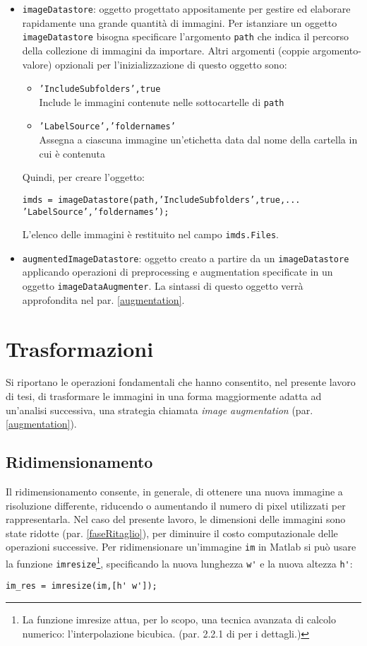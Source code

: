 \begin{itemize}

\item \verb|imageDatastore|: oggetto progettato appositamente per gestire ed elaborare rapidamente una grande quantità di immagini. Per istanziare un oggetto \verb|imageDatastore| bisogna specificare l'argomento \verb|path| che indica il percorso della collezione di immagini da importare. Altri argomenti (coppie argomento-valore) opzionali per l'inizializzazione di questo oggetto sono:
\begin{itemize}
\item \verb|’IncludeSubfolders’,true|\\
Include le immagini contenute nelle sottocartelle di \verb|path| 
\item \verb|’LabelSource’,’foldernames’|\\
Assegna a ciascuna immagine un’etichetta
data dal nome della cartella in cui è contenuta
\end{itemize}
Quindi, per creare l'oggetto:
\begin{verbatim}
imds = imageDatastore(path,’IncludeSubfolders’,true,...
’LabelSource’,’foldernames’);
\end{verbatim}
L’elenco delle immagini è restituito nel campo \verb|imds.Files|.

\item \verb|augmentedImageDatastore|: oggetto creato a partire da un \verb|imageDatastore| applicando operazioni di preprocessing e augmentation specificate in un oggetto \verb|imageDataAugmenter|. La sintassi di questo oggetto verrà approfondita nel par. \ref{augmentation}.

\end{itemize}

\section{Trasformazioni}
\label{trasformazioni}
Si riportano le operazioni fondamentali che hanno consentito, nel presente lavoro di tesi, di trasformare le immagini in una forma maggiormente adatta ad un’analisi successiva, una strategia chiamata \textit{image augmentation} (par. \ref{augmentation}).

\subsection{Ridimensionamento}
Il ridimensionamento consente, in generale, di ottenere una nuova immagine a risoluzione differente, riducendo o aumentando il numero di pixel utilizzati per rappresentarla.
Nel caso del presente lavoro, le dimensioni delle immagini sono state ridotte (par. \ref{faseRitaglio}), per diminuire il costo computazionale delle operazioni successive.
Per ridimensionare un'immagine \verb|im| in Matlab si può usare la funzione \verb|imresize|\footnote{La funzione imresize attua, per lo scopo, una tecnica avanzata di calcolo numerico: l’interpolazione bicubica. (par. 2.2.1 di \cite{gianvito} per i dettagli.)}, specificando la nuova lunghezza \verb|w'| e la nuova altezza \verb|h'|:
\begin{verbatim}
im_res = imresize(im,[h' w']);
\end{verbatim}

